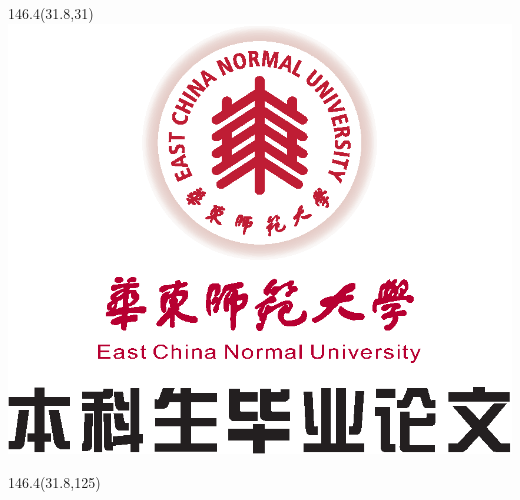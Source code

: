 
\thispagestyle{empty}
\begin{titlepage}
	\captionsetup{belowskip=0pt}
	
	\renewcommand{\ULthickness}{1.2pt}
	\begin{center}\noindent \bfseries {}\end{center}

	\begin{textblock}{146.4}(31.8,31)
		\centering
		\includegraphics{./figures/inner-cover(contains_font).eps}
	\end{textblock}

	\begin{textblock}{146.4}(31.8,125)
		\noindent
		\begin{minipage}[t][8.2cm][c]{\linewidth}
			\begin{center}
				\noindent\textbf{\zihao{1}{\rmfamily{\expandafter\uline\expandafter{\TitleCHS}}}}
			\end{center}
			\begin{center}
				\noindent\textbf{\zihao{1}{\rmfamily{\expandafter\uline\expandafter{\TitleENG}}}}
			\end{center}
		\end{minipage}
	\end{textblock}

	\renewcommand{\ULthickness}{0.4pt}


\end{titlepage}

